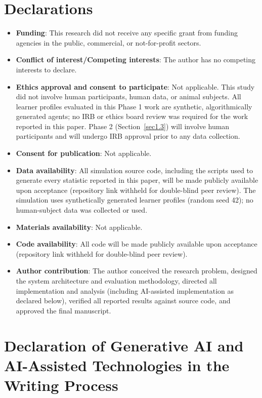 \documentclass[pdflatex,sn-apa]{sn-jnl}
\begin{document}
\backmatter

\section*{Declarations}

\begin{itemize}
\item \textbf{Funding}: This research did not receive any specific grant from funding agencies in the public, commercial, or not-for-profit sectors.
\item \textbf{Conflict of interest/Competing interests}: The author has no competing interests to declare.
\item \textbf{Ethics approval and consent to participate}: Not applicable. This study did not involve human participants, human data, or animal subjects. All learner profiles evaluated in this Phase 1 work are synthetic, algorithmically generated agents; no IRB or ethics board review was required for the work reported in this paper. Phase 2 (Section~\ref{sec1.3}) will involve human participants and will undergo IRB approval prior to any data collection.
\item \textbf{Consent for publication}: Not applicable.
\item \textbf{Data availability}: All simulation source code, including the scripts used to generate every statistic reported in this paper, will be made publicly available upon acceptance (repository link withheld for double-blind peer review). The simulation uses synthetically generated learner profiles (random seed 42); no human-subject data was collected or used.
\item \textbf{Materials availability}: Not applicable.
\item \textbf{Code availability}: All code will be made publicly available upon acceptance (repository link withheld for double-blind peer review).
\item \textbf{Author contribution}: The author conceived the research problem, designed the system architecture and evaluation methodology, directed all implementation and analysis (including AI-assisted implementation as declared below), verified all reported results against source code, and approved the final manuscript.
\end{itemize}

\section*{Declaration of Generative AI and AI-Assisted Technologies in the Writing Process}
\end{document}
